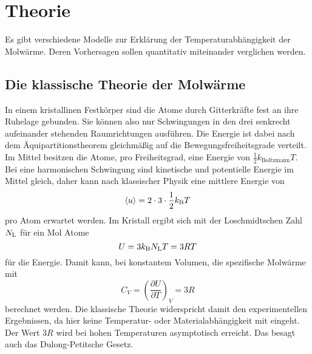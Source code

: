 ﻿\section{Theorie}
\label{sec:Theorie}
Es gibt verschiedene Modelle zur Erklärung der Temperaturabhängigkeit der Molwärme. Deren Vorhersagen sollen quantitativ miteinander verglichen werden.
\subsection{Die klassische Theorie der Molwärme}
In einem kristallinen Festkörper sind die Atome durch Gitterkräfte fest an ihre Ruhelage gebunden. Sie können also nur Schwingungen in den drei senkrecht aufeinander stehenden Raumrichtungen ausführen. Die Energie ist dabei nach dem Äquipartitionstheorem gleichmäßig auf die Bewegungsfreiheitsgrade verteilt. Im Mittel besitzen die Atome, pro Freiheitsgrad, eine Energie von $\frac{1}{2}k_\text{Boltzmann}T$. Bei eine harmonischen Schwingung sind kinetische und potentielle Energie im Mittel gleich, daher kann nach klassischer Physik eine mittlere Energie von
\begin{equation*}
	\langle u \rangle = 2\cdot3\cdot\frac{1}{2}k_\text B T
\end{equation*}
pro Atom erwartet werden.
Im Kristall ergibt sich mit der Loschmidtschen Zahl $N_\text L$ für ein Mol Atome 
\begin{equation*}
	U = 3k_\text B N_\text L T = 3RT
\end{equation*}
für die Energie.
Damit kann, bei konstantem Volumen, die spezifische Molwärme mit
\begin{equation*}
	C_V = \left(\frac{\partial U}{\partial T}\right)_V = 3R
\end{equation*}
berechnet werden.
Die klassische Theorie widerspricht damit den experimentellen Ergebnissen, da hier keine Temperatur- oder Materialabhängigkeit mit eingeht. Der Wert $3R$ wird bei hohen Temperaturen asymptotisch erreicht.
Das besagt auch das Dulong-Petitsche Gesetz.

